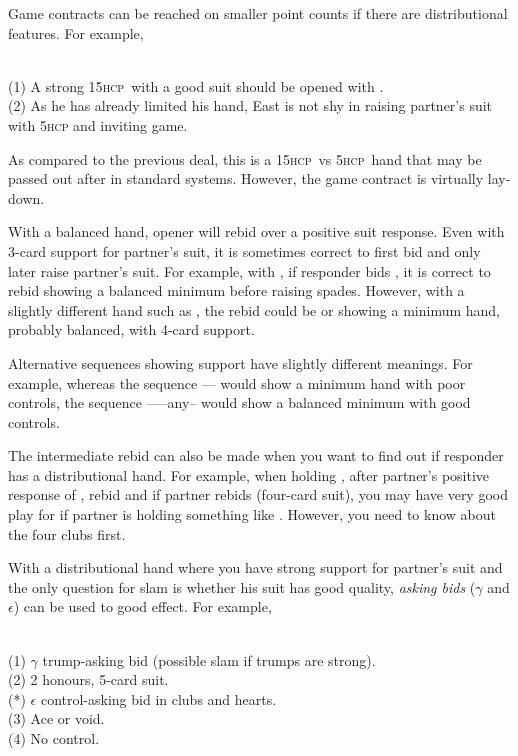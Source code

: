 \documentclass[a4paper,article,oneside]{memoir}
\newcommand{\gap}{\vspace{\baselineskip}}
\newcommand{\hcp}{\textsc{hcp}}
\begin{document}
\gap
Game contracts can be reached on smaller point counts if there are
distributional features. For example,

 \\ (1) A strong 15\hcp\ with a
good suit should be opened with .\\ (2) As he has already
limited his hand, East is not shy in raising partner's suit with 5\hcp
and inviting game.

As compared to the previous deal, this is a 15\hcp\ vs 5\hcp\ hand
that may be passed out after  in standard systems. However, the
game contract is virtually lay-down.

\gap
With a balanced hand, opener will rebid \nt{} over a positive suit
response.  Even with 3-card support for partner's suit, it is
sometimes correct to first bid \nt{} and only later raise partner's
suit. For example, with , if responder bids
, it is correct to rebid  showing a balanced minimum
before raising spades. However, with a slightly different hand such as
, the rebid could be  or  showing
a minimum hand, probably balanced, with 4-card support.

Alternative sequences showing support have slightly different
meanings.  For example, whereas the sequence ----
would show a minimum hand with poor controls, the sequence
------any-- would show a balanced minimum with
good controls.

The intermediate  rebid can also be made when you want to find
out if responder has a distributional hand. For example, when holding
, after partner's positive response of ,
rebid  and if partner rebids  (four-card suit), you may
have very good play for  if partner is holding something like
.  However, you need to know about the four
clubs first.

\gap
With a distributional hand where you have strong support for partner's
suit and the only question for slam is whether his suit has good
quality, \emph{asking bids} ($\gamma$ and $\epsilon$) can be used to
good effect. For example,

 \\
(1) $\gamma$ trump-asking bid (possible slam if trumps are strong). \\
(2) 2 honours, 5-card suit. \\ (*) $\epsilon$ control-asking bid in clubs and hearts. \\
(3) Ace or void. \\ (4) No control.
\end{document}
